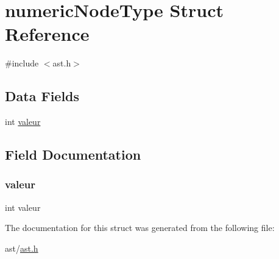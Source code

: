 \hypertarget{structnumeric_node_type}{}\section{numeric\+Node\+Type Struct Reference}
\label{structnumeric_node_type}


{\ttfamily \#include $<$ast.\+h$>$}

\subsection*{Data Fields}
\begin{DoxyCompactItemize}
\item 
int \hyperlink{structnumeric_node_type_a8e030c012e3b74a6d076739c4c7ecb69}{valeur}
\end{DoxyCompactItemize}


\subsection{Field Documentation}
\mbox{\label{structnumeric_node_type_a8e030c012e3b74a6d076739c4c7ecb69}} 
\subsubsection{\texorpdfstring{valeur}{valeur}}
{\footnotesize\ttfamily int valeur}



The documentation for this struct was generated from the following file\+:\begin{DoxyCompactItemize}
\item 
ast/\hyperlink{ast_8h}{ast.\+h}\end{DoxyCompactItemize}

